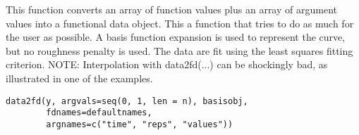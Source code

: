 \begin{Description}\relax
This function converts an array  of function values
plus an array  of argument values into a
functional data object.  This a function that tries to
do as much for the user as possible.  A basis function
expansion is used to represent the curve, but no roughness
penalty is used.  The data are fit using the least squares
fitting criterion.  NOTE:  Interpolation with data2fd(...) can be 
shockingly bad, as illustrated in one of the examples.
\end{Description}
\begin{Usage}
\begin{verbatim}
data2fd(y, argvals=seq(0, 1, len = n), basisobj,
        fdnames=defaultnames,
        argnames=c("time", "reps", "values"))
\end{verbatim}
\end{Usage}
